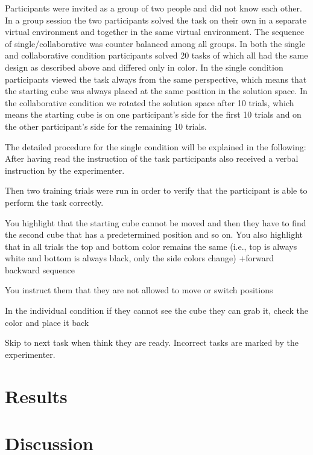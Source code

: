 \documentclass{article}
\begin{document}
Participants were invited as a group of two people and did not know each other. In a group session the two participants solved the task on their own in a separate virtual environment and together in the same virtual environment. The sequence of single/collaborative was counter balanced among all groups. In both the single and collaborative condition participants solved 20 tasks of which all had the same design as described above and differed only in color. In the single condition participants viewed the task always from the same perspective, which means that the starting cube was always placed at the same position in the solution space.
In the collaborative condition we rotated the solution space after 10 trials, which means the starting cube is on one participant's side for the first 10 trials and on the other participant's side for the remaining 10 trials. 

The detailed procedure for the single condition will be explained in the following:
After having read the instruction of the task participants also received a verbal instruction by the experimenter. 

Then two training trials were run in order to verify that the participant is able to perform the task correctly. 

You highlight that the starting cube cannot be moved and then they have to find the second cube that has a predetermined position and so on. You also highlight that in all trials the top and bottom color remains the same (i.e., top is always white and bottom is always black, only the side colors change)
+forward backward sequence

You instruct them that they are not allowed to move or switch positions

In the individual condition if they cannot see the cube they can grab it, check the color and place it back

Skip to next task when think they are ready. Incorrect tasks are marked by the experimenter.




\section{Results}



\section{Discussion}




\end{document}
